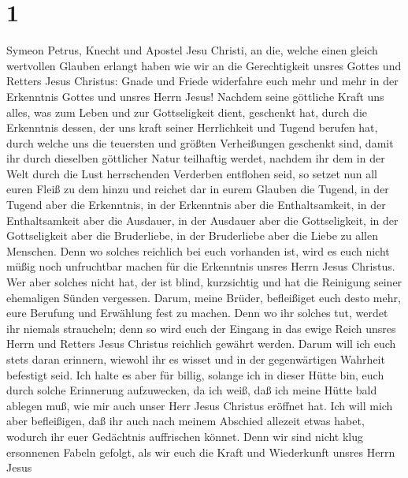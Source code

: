 \hypertarget{section}{%
\section{1}\label{section}}

 Symeon Petrus, Knecht und Apostel Jesu Christi, an die,
welche einen gleich wertvollen Glauben erlangt haben wie wir an die
Gerechtigkeit unsres Gottes und Retters Jesus Christus: 
Gnade und Friede widerfahre euch mehr und mehr in der Erkenntnis Gottes
und unsres Herrn Jesus!  Nachdem seine göttliche Kraft uns
alles, was zum Leben und zur Gottseligkeit dient, geschenkt hat, durch
die Erkenntnis dessen, der uns kraft seiner Herrlichkeit und Tugend
berufen hat,  durch welche uns die teuersten und größten
Verheißungen geschenkt sind, damit ihr durch dieselben göttlicher Natur
teilhaftig werdet, nachdem ihr dem in der Welt durch die Lust
herrschenden Verderben entflohen seid,  so setzet nun all
euren Fleiß zu dem hinzu und reichet dar in eurem Glauben die Tugend, in
der Tugend aber die Erkenntnis,  in der Erkenntnis aber
die Enthaltsamkeit, in der Enthaltsamkeit aber die Ausdauer, in der
Ausdauer aber die Gottseligkeit,  in der Gottseligkeit
aber die Bruderliebe, in der Bruderliebe aber die Liebe zu allen
Menschen.  Denn wo solches reichlich bei euch vorhanden
ist, wird es euch nicht müßig noch unfruchtbar machen für die Erkenntnis
unsres Herrn Jesus Christus.  Wer aber solches nicht hat,
der ist blind, kurzsichtig und hat die Reinigung seiner ehemaligen
Sünden vergessen.  Darum, meine Brüder, befleißiget euch
desto mehr, eure Berufung und Erwählung fest zu machen. Denn wo ihr
solches tut, werdet ihr niemals straucheln;  denn so wird
euch der Eingang in das ewige Reich unsres Herrn und Retters Jesus
Christus reichlich gewährt werden.  Darum will ich euch
stets daran erinnern, wiewohl ihr es wisset und in der gegenwärtigen
Wahrheit befestigt seid.  Ich halte es aber für billig,
solange ich in dieser Hütte bin, euch durch solche Erinnerung
aufzuwecken,  da ich weiß, daß ich meine Hütte bald
ablegen muß, wie mir auch unser Herr Jesus Christus eröffnet hat.
 Ich will mich aber befleißigen, daß ihr auch nach meinem
Abschied allezeit etwas habet, wodurch ihr euer Gedächtnis auffrischen
könnet.  Denn wir sind nicht klug ersonnenen Fabeln
gefolgt, als wir euch die Kraft und Wiederkunft unsres Herrn Jesus
